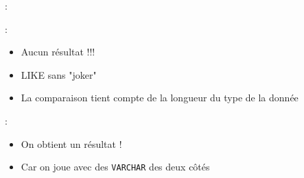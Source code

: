 \documentclass[10pt]{beamer}
\begin{document}
\begin{frame}{\secname : \subsecname}
    
\end{frame}

\begin{frame}{\secname : \subsecname}
    
    \begin{itemize}
        \item Aucun résultat !!!
        \item LIKE sans "joker"
        \item La comparaison tient compte de la longueur du type de la donnée
    \end{itemize}
\end{frame}

\begin{frame}{\secname : \subsecname}
    
    \begin{itemize}
        \item On obtient un résultat !
        \item Car on joue avec des \lstinline[language=plsql]!VARCHAR! des deux côtés
    \end{itemize}
\end{frame}
\end{document}
